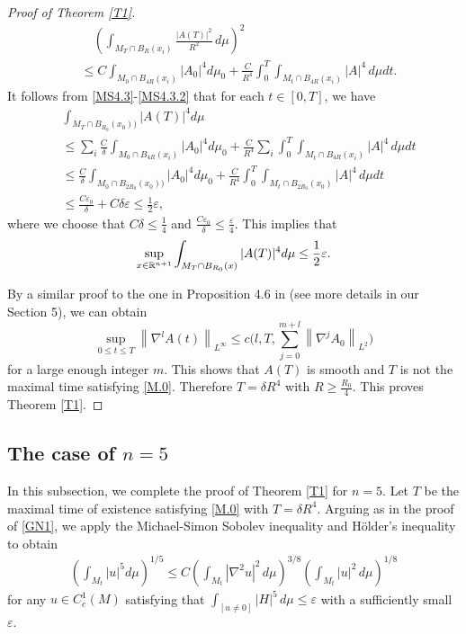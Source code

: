 \documentclass{amsart}
\theoremstyle{definition}
\def\R{{\Bbb R}}
\numberwithin{equation}{section}
\begin{document}
\begin{proof}[Proof of Theorem  \ref{T1}]
\begin{align}\label{MS4.3.2}
 &\quad \left (   \int_{  M_T\cap B_{R}(x_i) }\frac  {|  A(T)|^2}{R^2}  \,d\mu\right )^2\\
 &\leq  C \int_{  M_0\cap B_{4R}(x_i)}|A_0|^4 d\mu_{0}+\frac {C} {R^4} \int_0^T\int_{  M_t\cap B_{4R}(x_i)}|A|^4\,d\mu dt
  \nonumber.
\end{align}
It follows from \eqref{MS4.3}-\eqref{MS4.3.2} that for each $t\in [0,T]$, we have
\begin{align}\label{MS4.4.4}
 & \int_{  M_T\cap B_{R_0}(x_0))} |A(T)|^{4}d\mu\\
 &\leq \sum_i\frac  C{\delta}  \int_{  M_0\cap B_{4R}(x_i)}|A_0|^4 d\mu_{0}+\frac {C} {R^4}  \sum_i\int_0^T\int_{
  M_t\cap B_{4R}(x_i)}|A|^4\,d\mu d t\nonumber \\
 &\leq   \frac  C{\delta} \int_{  M_0\cap B_{2R_0}(x_0))}|A_0|^4 d\mu_{0}+  \frac {C} {R^4} \int_0^T\int_{  M_t\cap B_{2R_0}(x_0)}|A|^4\,d \mu
 dt\nonumber\\
&\leq \frac {C\varepsilon_0}{\delta}+C\delta  \varepsilon\leq \frac 12 \varepsilon, \nonumber
\end{align}
where we choose that $C\delta\leq \frac 1 4$ and $\frac {C\varepsilon_0}{\delta}\leq \frac {\varepsilon} 4$. This implies that
\[\sup_{x\in\R^{n+1}}\int_{  M_T\cap B_{R_0}(x)} |A(T)|^{4}d\mu\leq \frac 12 \varepsilon . \]

 By  a similar proof to the one in
Proposition 4.6 in \cite{KS1} (see more details in our Section 5), we can obtain
 $$\sup_{0\leq t\leq T}\left\| \nabla^{l} A(t) \right\|_{L^{\infty}} \leq c\big ( l, T, \sum_{j=0}^{m+l} \left\| \nabla^{j} A_{0} \right\|_{L^2} \big )$$
 for a large enough integer $m$.
 This shows that $A(T)$ is smooth and   $T$ is not the maximal time satisfying \eqref{M.0}.
 Therefore $T=\delta R^4$ with $R\geq \frac  {R_0}4$.
This proves Theorem  \ref{T1}.

\end{proof}
\subsection{The case of $n=5$}

In this subsection,  we complete  the proof of Theorem  \ref{T1} for  $n=5$.
Let $T$ be the maximal time of existence   satisfying \eqref{M.0} with $T=\delta R^4$.
Arguing as in the proof of \eqref{GN1}, we apply the Michael-Simon Sobolev inequality   and H\"older's inequality to obtain
\begin{align}\label{GN2}
 \left (\int_{M_t} |u|^{5} d\mu \right )^{1/5} \leq C \left (  \int_{M_t} |\nabla^2 u|^2 \,d\mu \right )^{3/8} \left
 (   \int_{M_t} |  u|^2  \,d\mu\right )^{1/8}
\end{align}
 for any $u\in
C^{1}_{c}\left( M \right)$ satisfying  that $\int_{[u\neq 0]}|H|^5\,d\mu\leq \varepsilon$ with a sufficiently small $\varepsilon$.
\end{document}
